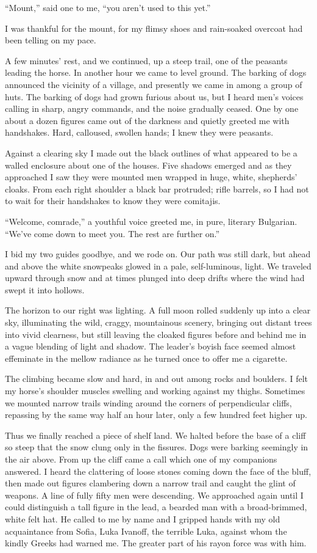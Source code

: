 \documentclass[a5paper,12pt]{book}
\begin{document}
“Mount,” said one to me, “you aren't used to this yet.”

I was thankful for the mount, for my flimsy shoes and rain-soaked overcoat had been telling on my pace.

A few minutes' rest, and we continued, up a steep trail, one of the peasants leading the horse. In another hour we came to level ground. The barking of dogs announced the vicinity of a village, and presently we came in among a group of huts. The barking of dogs had grown furious about us, but I heard men’s voices calling in sharp, angry commands, and the noise gradually ceased. One by one about a dozen figures came out of the darkness and quietly greeted me with handshakes. Hard, calloused, swollen hands; I knew they were peasants.

Against a clearing sky I made out the black outlines of what appeared to be a walled enclosure about one of the houses. Five shadows emerged and as they approached I saw they were mounted men wrapped in huge, white, shepherds’ cloaks. From each right shoulder a black bar protruded; rifle barrels, so I had not to wait for their handshakes to know they were comitajis.

“Welcome, comrade,” a youthful voice greeted me, in pure, literary Bulgarian. “We’ve come down to meet you. The rest are further on.”

I bid my two guides goodbye, and we rode on. Our path was still dark, but ahead and above the white snowpeaks glowed in a pale, self-luminous, light. We traveled upward through snow and at times plunged into deep drifts where the wind had swept it into hollows.

The horizon to our right was lighting. A full moon rolled suddenly up into a clear sky, illuminating the wild, craggy, mountainous scenery, bringing out distant trees into vivid clearness, but still leaving the cloaked figures before and behind me in a vague blending of light and shadow. The leader’s boyish face seemed almost effeminate in the mellow radiance as he turned once to offer me a cigarette.

The climbing became slow and hard, in and out among rocks and boulders. I felt my horse’s shoulder muscles swelling and working against my thighs. Sometimes we mounted narrow trails winding around the corners of perpendicular cliffs, repassing by the same way half an hour later, only a few hundred feet higher up.

Thus we finally reached a piece of shelf land. We halted before the base of a cliff so steep that the snow clung only in the fissures. Dogs were barking seemingly in the air above. From up the cliff came a call which one of my companions answered. I heard the clattering of loose stones coming down the face of the bluff, then made out figures clambering down a narrow trail and caught the glint of weapons. A line of fully fifty men were descending. We approached again until I could distinguish a tall figure in the lead, a bearded man with a broad-brimmed, white felt hat. He called to me by name and I gripped hands with my old acquaintance from Sofia, Luka Ivanoff, the terrible Luka, against whom the kindly Greeks had warned me. The greater part of his rayon force was with him.
\end{document}
